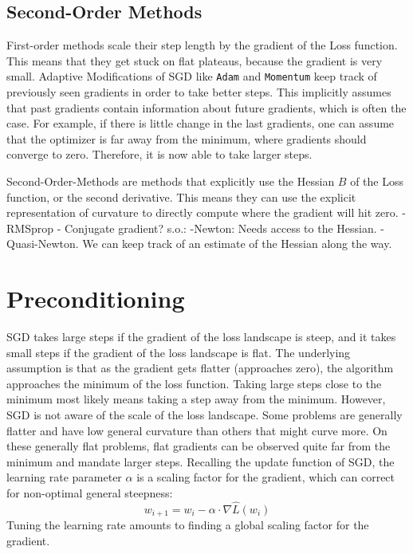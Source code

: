 \documentclass[twoside,12pt,a4paper]{report}
\begin{document}
\subsection{Second-Order Methods}
First-order methods scale their step length by the gradient of the Loss function. This means that they get stuck on flat plateaus, because the gradient is very small.
Adaptive Modifications of SGD like \verb|Adam| and \verb|Momentum| keep track of previously seen gradients in order to take better steps. This implicitly assumes that past gradients contain information about future gradients, which is often the case.
For example, if there is little change in the last gradients, one can assume that the optimizer is far away from the minimum, where gradients should converge to zero. Therefore, it is now able to take larger steps.

Second-Order-Methods are methods that explicitly use the Hessian $B$ of the Loss function, or the second derivative. This means they can use the explicit representation of curvature to directly compute where the gradient will hit zero.
-RMSprop
- Conjugate gradient?
s.o.:
-Newton: Needs access to the Hessian.
-Quasi-Newton.
We can keep track of an estimate of the Hessian along the way.


\section{Preconditioning} \label{sec:preconditioning}
SGD takes large steps if the gradient of the loss landscape is steep, and it takes small steps if the gradient of the loss landscape is flat. The underlying assumption is that as the gradient gets flatter (approaches zero), the algorithm approaches the minimum of the loss function. Taking large steps close to the minimum most likely means taking a step away from the minimum.
However, SGD is not aware of the scale of the loss landscape. Some problems are generally flatter and have low general curvature than others that might curve more. On these generally flat problems, flat gradients can be observed quite far from the minimum and mandate larger steps.
Recalling the update function of SGD, the learning rate parameter $\alpha$ is a scaling factor for the gradient, which can correct for non-optimal general steepness:
$$w_{i+1} = w_i - \alpha \cdot \nabla \hat{L}(w_i) $$
Tuning the learning rate amounts to finding a global scaling factor for the gradient.
\end{document}
